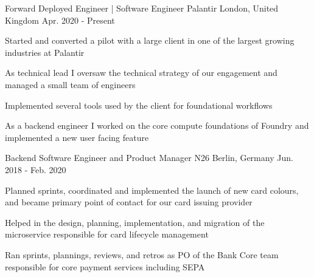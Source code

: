 


\begin{cventries}


\cventry
{Forward Deployed Engineer | Software Engineer} %
{Palantir} %
{London, United Kingdom} %
{Apr. 2020 - Present} %
{ %
\begin{cvitems}
\item {Started and converted a pilot with a large client in one of the largest growing industries at Palantir}
\item {As technical lead I oversaw the technical strategy of our engagement and managed a small team of engineers}
\item {Implemented several tools used by the client for foundational workflows}
\item {As a backend engineer I worked on the core compute foundations of Foundry and implemented a new user facing feature}
\end{cvitems}
}


\cventry
{Backend Software Engineer and Product Manager} %
{N26} %
{Berlin, Germany} %
{Jun. 2018 - Feb. 2020} %
{ %
\begin{cvitems}
\item {Planned sprints, coordinated and implemented the launch of new card colours, and became primary point of contact for our card issuing provider}
\item {Helped in the design, planning, implementation, and migration of the microservice responsible for card lifecycle management}
\item {Ran sprints, plannings, reviews, and retros as PO of the Bank Core team responsible for core payment services including SEPA}
\end{cvitems}
}


\end{cventries}
